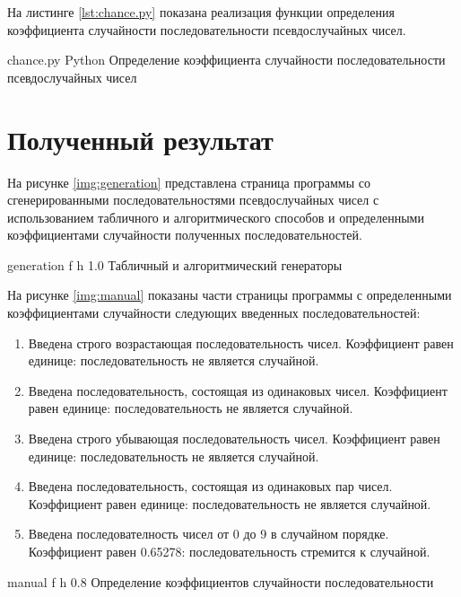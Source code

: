 На листинге \ref{lst:chance.py} показана реализация функции определения коэффициента случайности последовательности псевдослучайных чисел.

    {chance.py}
    {Python}
    {Определение коэффициента случайности последовательности псевдослучайных чисел}


\section{Полученный результат}

На рисунке \ref{img:generation} представлена страница программы со сгенерированными последовательностями псевдослучайных чисел с использованием табличного и алгоритмического способов и определенными коэффициентами случайности полученных последовательностей.

    {generation}
    {f}
    {h}
    {1.0\textwidth}
    {Табличный и алгоритмический генераторы}
    
На рисунке \ref{img:manual} показаны части страницы программы с определенными коэффициентами случайности следующих введенных последовательностей:
    
\begin{enumerate}
	\item Введена строго возрастающая последовательность чисел. Коэффициент равен единице: последовательность не является случайной.
	\item Введена последовательность, состоящая из одинаковых чисел. Коэффициент равен единице: последовательность не является случайной.
	\item Введена строго убывающая последовательность чисел. Коэффициент равен единице: последовательность не является случайной.
	\item Введена последовательность, состоящая из одинаковых пар чисел. Коэффициент равен единице: последовательность не является случайной.
	\item Введена последователность чисел от 0 до 9 в случайном порядке. Коэффициент равен 0.65278: последовательность стремится к случайной.
\end{enumerate}
    
    {manual}
    {f}
    {h}
    {0.8\textwidth}
    {Определение коэффициентов случайности последовательности}
